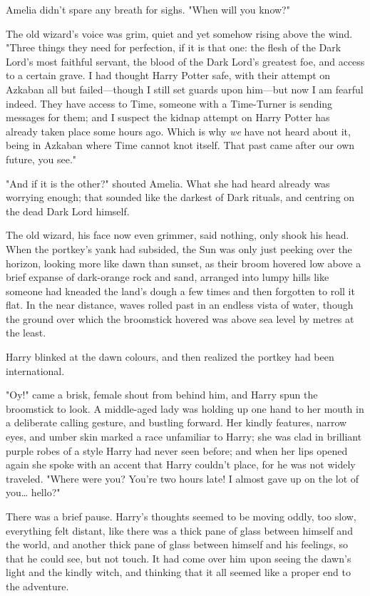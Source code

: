 Amelia didn't spare any breath for sighs. "When will you know?"

The old wizard's voice was grim, quiet and yet somehow rising above the wind.
"Three things they need for perfection, if it is that one: the flesh of the
Dark Lord's most faithful servant, the blood of the Dark Lord's greatest foe,
and access to a certain grave. I had thought Harry Potter safe, with their
attempt on Azkaban all but failed---though I still set guards upon him---but
now I am fearful indeed. They have access to Time, someone with a Time-Turner
is sending messages for them; and I suspect the kidnap attempt on Harry Potter
has already taken place some hours ago. Which is why \emph{we} have not heard
about it, being in Azkaban where Time cannot knot itself. That past came after
our own future, you see."

"And if it is the other?" shouted Amelia. What she had heard already was
worrying enough; that sounded like the darkest of Dark rituals, and centring
on the dead Dark Lord himself.

The old wizard, his face now even grimmer, said nothing, only shook his head.
\later
When the portkey's yank had subsided, the Sun was only just peeking over the
horizon, looking more like dawn than sunset, as their broom hovered low above a
brief expanse of dark-orange rock and sand, arranged into lumpy hills like
someone had kneaded the land's dough a few times and then forgotten to roll it
flat. In the near distance, waves rolled past in an endless vista of water,
though the ground over which the broomstick hovered was above sea level by
metres at the least.

Harry blinked at the dawn colours, and then realized the portkey had been
international.

"Oy!" came a brisk, female shout from behind him, and Harry spun the broomstick
to look. A middle-aged lady was holding up one hand to her mouth in a
deliberate calling gesture, and bustling forward. Her kindly features, narrow
eyes, and umber skin marked a race unfamiliar to Harry; she was clad in
brilliant purple robes of a style Harry had never seen before; and when her
lips opened again she spoke with an accent that Harry couldn't place, for he
was not widely traveled. "Where were you? You're two hours late! I almost gave
up on the lot of you{\ldots} hello?"

There was a brief pause. Harry's thoughts seemed to be moving oddly, too slow,
everything felt distant, like there was a thick pane of glass between himself
and the world, and another thick pane of glass between himself and his
feelings, so that he could see, but not touch. It had come over him upon seeing
the dawn's light and the kindly witch, and thinking that it all seemed like a
proper end to the adventure.

